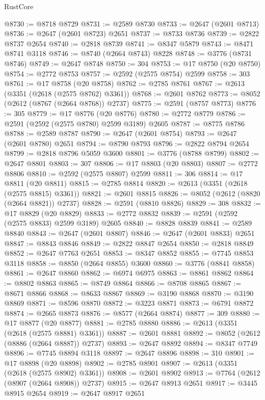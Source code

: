 \begin{lexlean}{RustCore}
\begin{coremodule}
@8730 := @8718 @8729
@8731 := @2589 @8730
@8733 := @2647 (@2601 @8713)
@8736 := @2647 (@2601 @8723) @2651
@8737 := @8733 @8736
@8739 := @2822 @8737 @2654
@8740 := @2818 @8739
@8741 := @8347 @5879
@8743 := @8471 @8741 @3118
@8746 := @8740 (@2664 @8743) @8228
@8748 := @3776 (@8731 @8746)
@8749 := @2647 @8748
@8750 := 304
@8753 := @17 @8750 (@20 @8750)
@8754 := @2772 @8753
@8757 := @2592 (@2575 @8754) @2599
@8758 := 303
@8761 := @17 @8758 (@20 @8758)
@8762 := @2785 @8761
@8767 := @2613 (@3351 (@2618 (@2575 @8762) @3361))
@8768 := @2601 @8762
@8773 := @8052 (@2612 (@8767 (@2664 @8768)) @2737)
@8775 := @2591 (@8757 @8773)
@8776 := 305
@8779 := @17 @8776 (@20 @8776)
@8780 := @2772 @8779
@8786 := @2591 (@2592 (@2575 @8780) @2599 @3189) @2605
@8787 := @8775 @8786
@8788 := @2589 @8787
@8790 := @2647 (@2601 @8754)
@8793 := @2647 (@2601 @8780) @2651
@8794 := @8790 @8793
@8796 := @2822 @8794 @2654
@8799 := @2818 @8796 @5059 @3600
@8801 := @3776 (@8788 @8799)
@8802 := @2647 @8801
@8803 := 307
@8806 := @17 @8803 (@20 @8803)
@8807 := @2772 @8806
@8810 := @2592 (@2575 @8807) @2599
@8811 := 306
@8814 := @17 @8811 (@20 @8811)
@8815 := @2785 @8814
@8820 := @2613 (@3351 (@2618 (@2575 @8815) @3361))
@8821 := @2601 @8815
@8826 := @8052 (@2612 (@8820 (@2664 @8821)) @2737)
@8828 := @2591 (@8810 @8826)
@8829 := 308
@8832 := @17 @8829 (@20 @8829)
@8833 := @2772 @8832
@8839 := @2591 (@2592 (@2575 @8833) @2599 @3189) @2605
@8840 := @8828 @8839
@8841 := @2589 @8840
@8843 := @2647 (@2601 @8807)
@8846 := @2647 (@2601 @8833) @2651
@8847 := @8843 @8846
@8849 := @2822 @8847 @2654
@8850 := @2818 @8849
@8852 := @2647 @7763 @2651
@8853 := @8347 @8852
@8855 := @7745 @8853 @3118
@8858 := @8850 (@2664 @8855) @3600
@8860 := @3776 (@8841 @8858)
@8861 := @2647 @8860
@8862 := @6974 @6975
@8863 := @8861 @8862
@8864 := @8802 @8863
@8865 := @8749 @8864
@8866 := @8708 @8865
@8867 := @8671 @8866
@8868 := @8633 @8867
@8869 := @3190 @8868
@8870 := @3190 @8869
@8871 := @8596 @8870
@8872 := @3223 @8871
@8873 := @6791 @8872
@8874 := @2665 @8873
@8876 := @8577 (@2664 @8874)
@8877 := 309
@8880 := @17 @8877 (@20 @8877)
@8881 := @2785 @8880
@8886 := @2613 (@3351 (@2618 (@2575 @8881) @3361))
@8887 := @2601 @8881
@8892 := @8052 (@2612 (@8886 (@2664 @8887)) @2737)
@8893 := @2647 @8892
@8894 := @8347 @7749
@8896 := @7745 @8894 @3118
@8897 := @2647 @8896
@8898 := 310
@8901 := @17 @8898 (@20 @8898)
@8902 := @2785 @8901
@8907 := @2613 (@3351 (@2618 (@2575 @8902) @3361))
@8908 := @2601 @8902
@8913 := @7764 (@2612 (@8907 (@2664 @8908)) @2737)
@8915 := @2647 @8913 @2651
@8917 := @3445 @8915 @2654
@8919 := @2647 @8917 @2651

\end{coremodule}
\end{lexlean}
